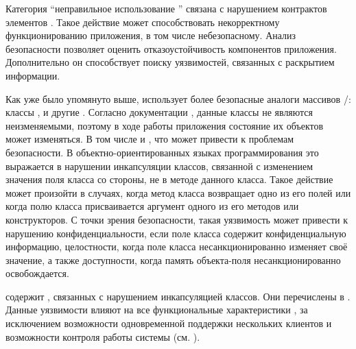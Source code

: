 %
Категория ``неправильное использование '' связана с нарушением контрактов элементов  . 
%
Такое действие может способствовать некорректному функционированию приложения, в том числе небезопасному. 
%
Анализ безопасности   позволяет оценить отказоустойчивость компонентов приложения. 
%
Дополнительно он способствует поиску уязвимостей, связанных с раскрытием информации. 

%
Как уже было упомянуто выше,  использует более безопасные аналоги массивов /: классы ,  и другие . 
%
Согласно документации  , данные классы не являются неизменяемыми, поэтому в ходе работы приложения состояние их объектов может изменяться. 
%
В том числе и , что может привести к проблемам безопасности.
%
В объектно-ориентированных языках программирования это выражается в нарушении инкапсуляции классов, связанной с изменением значения поля класса со стороны, не в методе данного класса.
%
Такое действие может произойти в случаях, когда метод класса возвращает одно из его полей или когда полю класса присваивается аргумент одного из его методов или конструкторов.
%
С точки зрения безопасности, такая уязвимость может привести к нарушению конфиденциальности, если поле класса содержит конфиденциальную информацию, целостности, когда поле класса несанкционированно изменяет своё значение, а также доступности, когда память объекта-поля несанкционированно освобождается. 

%
  содержит , связанных с нарушением инкапсуляцией классов. Они перечислены в . Данные уязвимости влияют на все функциональные характеристики , за исключением возможности одновременной поддержки нескольких клиентов и возможности контроля работы системы (см. ).


